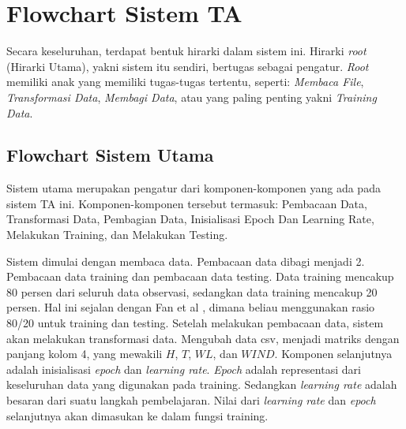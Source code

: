\section{Flowchart Sistem TA}

Secara keseluruhan, terdapat bentuk hirarki dalam sistem ini. Hirarki \emph{root} (Hirarki Utama), yakni sistem itu sendiri, bertugas sebagai pengatur. \emph{Root} memiliki anak yang memiliki tugas-tugas tertentu, seperti: \emph{Membaca File}, \emph{Transformasi Data}, \emph{Membagi Data}, atau yang paling penting yakni \emph{Training Data}.

\subsection{Flowchart Sistem Utama}

  Sistem utama merupakan pengatur dari komponen-komponen yang ada pada sistem TA ini. Komponen-komponen tersebut termasuk: Pembacaan Data, Transformasi Data, Pembagian Data, Inisialisasi Epoch Dan Learning Rate, Melakukan Training, dan Melakukan Testing.

  Sistem dimulai dengan membaca data. Pembacaan data dibagi menjadi 2. Pembacaan data training dan pembacaan data testing. Data training mencakup 80 persen dari seluruh data observasi, sedangkan data training mencakup 20 persen. Hal ini sejalan dengan Fan et al \cite{fan2008liblinear}, dimana beliau menggunakan rasio 80/20 untuk training dan testing. Setelah melakukan pembacaan data, sistem akan melakukan transformasi data. Mengubah data csv, menjadi matriks dengan panjang kolom 4, yang mewakili $H$, $T$, $WL$, dan $WIND$. Komponen selanjutnya adalah inisialisasi \emph{epoch} dan \emph{learning rate}. \emph{Epoch} adalah representasi dari keseluruhan data yang digunakan pada training. Sedangkan \emph{learning rate} adalah besaran dari suatu langkah pembelajaran. Nilai dari \emph{learning rate} dan \emph{epoch} selanjutnya akan dimasukan ke dalam fungsi training. 

